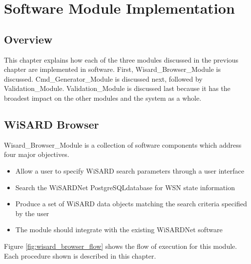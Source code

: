 
\chapter{Software Module Implementation}
\label{Chapter 5}
\lhead{}


\section{Overview}
This chapter explains how each of the three modules discussed in the previous chapter are implemented in software. First, Wisard\_Browser\_Module is discussed. Cmd\_Generator\_Module is discussed next, followed by Validation\_Module. Validation\_Module is discussed last because it has the broadest impact on the other modules and the system as a whole. 

\section{WiSARD Browser}
Wisard\_Browser\_Module is a collection of software components which address four major objectives.

\begin{itemize}
	\item Allow a user to specify WiSARD search parameters through a user interface
	\item Search the WiSARDNet PostgreSQLdatabase for WSN state information
	\item Produce a set of WiSARD data objects matching the search criteria specified by the user
	\item The module should integrate with the existing WiSARDNet software
\end{itemize}

Figure \ref{fig:wisard_browser_flow} shows the flow of execution for this module. Each procedure shown is described in this chapter.

